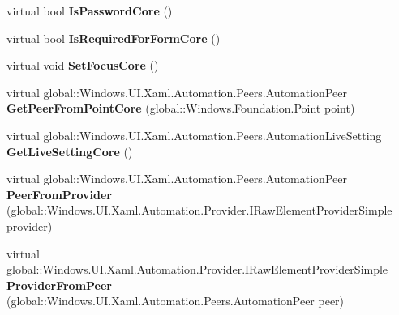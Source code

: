 \begin{DoxyCompactItemize}
virtual bool {\bfseries Is\+Password\+Core} ()
\item 
\mbox{\label{class_windows_1_1_u_i_1_1_xaml_1_1_automation_1_1_peers_1_1_automation_peer_a0936e74a3f6ad1b97d4432d0e591f140}} 
virtual bool {\bfseries Is\+Required\+For\+Form\+Core} ()
\item 
\mbox{\label{class_windows_1_1_u_i_1_1_xaml_1_1_automation_1_1_peers_1_1_automation_peer_aa7889a5f57de469eafa2b358f03ce530}} 
virtual void {\bfseries Set\+Focus\+Core} ()
\item 
\mbox{\label{class_windows_1_1_u_i_1_1_xaml_1_1_automation_1_1_peers_1_1_automation_peer_af1a638c64d6aba46c623ea842fc206ac}} 
virtual global\+::\+Windows.\+U\+I.\+Xaml.\+Automation.\+Peers.\+Automation\+Peer {\bfseries Get\+Peer\+From\+Point\+Core} (global\+::\+Windows.\+Foundation.\+Point point)
\item 
\mbox{\label{class_windows_1_1_u_i_1_1_xaml_1_1_automation_1_1_peers_1_1_automation_peer_a237b9e6ecc2fb3779ea808e8460aaa07}} 
virtual global\+::\+Windows.\+U\+I.\+Xaml.\+Automation.\+Peers.\+Automation\+Live\+Setting {\bfseries Get\+Live\+Setting\+Core} ()
\item 
\mbox{\label{class_windows_1_1_u_i_1_1_xaml_1_1_automation_1_1_peers_1_1_automation_peer_afb1e787b7ca36dd06affdaa830a30a27}} 
virtual global\+::\+Windows.\+U\+I.\+Xaml.\+Automation.\+Peers.\+Automation\+Peer {\bfseries Peer\+From\+Provider} (global\+::\+Windows.\+U\+I.\+Xaml.\+Automation.\+Provider.\+I\+Raw\+Element\+Provider\+Simple provider)
\item 
\mbox{\label{class_windows_1_1_u_i_1_1_xaml_1_1_automation_1_1_peers_1_1_automation_peer_a8d1ce21375148b3c860bc66fa5df87fa}} 
virtual global\+::\+Windows.\+U\+I.\+Xaml.\+Automation.\+Provider.\+I\+Raw\+Element\+Provider\+Simple {\bfseries Provider\+From\+Peer} (global\+::\+Windows.\+U\+I.\+Xaml.\+Automation.\+Peers.\+Automation\+Peer peer)

\end{DoxyCompactItemize}
